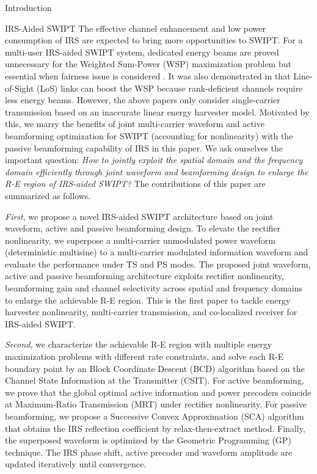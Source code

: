 \documentclass[journal]{IEEEtran}
\begin{document}
\begin{section}{Introduction}
		\begin{subsection}{IRS-Aided SWIPT}
			The effective channel enhancement and low power consumption of IRS are expected to bring more opportunities to SWIPT. For a multi-user IRS-aided SWIPT system, dedicated energy beams are proved unnecessary for the Weighted Sum-Power (WSP) maximization problem \cite{Wu2020b} but essential when fairness issue is considered \cite{Tang2019}. It was also demonstrated in \cite{Wu2020a} that Line-of-Sight (LoS) links can boost the WSP because rank-deficient channels require less energy beams. However, the above papers only consider single-carrier transmission based on an inaccurate linear energy harvester model. Motivated by this, we marry the benefits of joint multi-carrier waveform and active beamforming optimization for SWIPT (accounting for nonlinearity) with the passive beamforming capability of IRS in this paper. We ask ourselves the important question: \emph{How to jointly exploit the spatial domain and the frequency domain efficiently through joint waveform and beamforming design to enlarge the R-E region of IRS-aided SWIPT?} The contributions of this paper are summarized as follows.

			\emph{First}, we propose a novel IRS-aided SWIPT architecture based on joint waveform, active and passive beamforming design. To elevate the rectifier nonlinearity, we superpose a multi-carrier unmodulated power waveform (deterministic multisine) to a multi-carrier modulated information waveform and evaluate the performance under TS and PS modes. The proposed joint waveform, active and passive beamforming architecture exploits rectifier nonlinearity, beamforming gain and channel selectivity across spatial and frequency domains to enlarge the achievable R-E region. This is the first paper to tackle energy harvester nonlinearity, multi-carrier transmission, and co-localized receiver for IRS-aided SWIPT.

			\emph{Second}, we characterize the achievable R-E region with multiple energy maximization problems with different rate constraints, and solve each R-E boundary point by an Block Coordinate Descent (BCD) algorithm based on the Channel State Information at the Transmitter (CSIT). For active beamforming, we prove that the global optimal active information and power precoders coincide at Maximum-Ratio Transmission (MRT) under rectifier nonlinearity. For passive beamforming, we propose a Successive Convex Approximation (SCA) algorithm that obtains the IRS reflection coefficient by relax-then-extract method. Finally, the superposed waveform is optimized by the Geometric Programming (GP) technique. The IRS phase shift, active precoder and waveform amplitude are updated iteratively until convergence.


\end{subsection}
\end{section}
\end{document}
